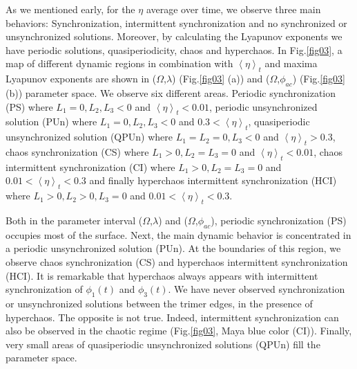 \documentclass[aps,pre,reprint,groupedaddress]{revtex4-1}
\begin{document}
As we mentioned early, for the $\eta$ average over time, we observe three main behaviors: Synchronization, intermittent synchronization and no synchronized or unsynchronized solutions. Moreover, by calculating the Lyapunov exponents we have periodic solutions, quasiperiodicity, chaos and hyperchaos. In Fig.\ref{fig03}, a map of different dynamic regions in combination with $\left\langle \eta\right\rangle_{t}$ and maxima Lyapunov exponents are shown in ($\Omega$,$\lambda$) (Fig.\ref{fig03} (a)) and ($\Omega$,$\phi_{ac}$) (Fig.\ref{fig03} (b)) parameter space. We observe six different areas. Periodic synchronization (PS) where $L_{1}=0, L_{2}, L_{3} <0$ and $\left\langle \eta\right\rangle _{t} < 0.01$, periodic unsynchronized solution (PUn)  where $L_{1}=0, L_{2}, L_{3} <0$ and $0.3<\left\langle \eta\right\rangle _{t}$, quasiperiodic unsynchronized solution (QPUn) where $L_{1}=L_{2}=0, L_{3}<0$ and $\left\langle \eta\right\rangle _{t} > 0.3$, chaos synchronization (CS) where $L_{1}>0,L_{2}=L_{3}=0$ and $\left\langle \eta\right\rangle _{t} < 0.01$, chaos intermittent synchronization (CI)  where $L_{1}>0,L_{2}=L_{3}=0$ and $0.01<\left\langle \eta\right\rangle _{t} < 0.3$ and finally hyperchaos intermittent synchronization (HCI) where $L_{1}>0,L_{2}>0,L_{3}=0$ and $0.01<\left\langle \eta\right\rangle _{t} < 0.3$.

Both in the parameter interval ($\Omega$,$\lambda$) and ($\Omega$,$\phi_{ac}$), periodic synchronization (PS) occupies most of the surface. Next, the main dynamic behavior is concentrated in a periodic unsynchronized solution (PUn). At the boundaries of this region, we observe chaos synchronization (CS) and hyperchaos intermittent synchronization (HCI). It is remarkable that hyperchaos always appears with intermittent synchronization of $\phi_{1}(t)$ and $\phi_{3}(t)$. We have never observed synchronization or unsynchronized solutions between the trimer edges, in the presence of hyperchaos. The opposite is not true. Indeed, intermittent synchronization can also be observed in the chaotic regime (Fig.\ref{fig03}, Maya blue color (CI)). Finally, very small areas of quasiperiodic unsynchronized solutions (QPUn) fill the parameter space.
\end{document}

